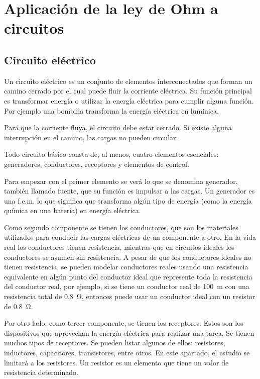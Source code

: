 \section{Aplicación de la ley de Ohm a circuitos}

\subsection{Circuito eléctrico}

Un circuito eléctrico es un conjunto de elementos interconectados que forman un camino cerrado por el cual puede fluir la corriente eléctrica. Su función principal es transformar energía o utilizar la energía eléctrica para cumplir alguna función. Por ejemplo una bombilla transforma la energía eléctrica en lumínica.

Para que la corriente fluya, el circuito debe estar cerrado. Si existe alguna interrupción en el camino, las cargas no pueden circular.

Todo circuito básico consta de, al menos, cuatro elementos esenciales: generadores, conductores, receptores y elementos de control.

Para empezar con el primer elemento se verá lo que se denomina generador, también llamado fuente, que su función es impulsar a las cargas. Un generador es una f.e.m. lo que significa que transforma algún tipo de energía (como la energía química en una batería) en energía eléctrica. 

Como segundo componente se tienen los conductores, que son los materiales utilizados para conducir las cargas eléctricas de un componente a otro. En la vida real los conductores tienen resistencia, mientras que en circuitos ideales los conductores se asumen sin resistencia. A pesar de que los conductores ideales no tienen resistencia, se pueden modelar conductores reales usando una resistencia equivalente en algún punto del conductor ideal que represente toda la resistencia del conductor real, por ejemplo, si se tiene un conductor real de \qty{100}{\metre} con una resistencia total de \qty{0.8}{\ohm}, entonces puede usar un conductor ideal con un resistor de \qty{0.8}{\ohm}.

Por otro lado, como tercer componente, se tienen los receptores. Estos son los dispositivos que aprovechan la energía eléctrica para realizar una tarea. Se tienen muchos tipos de receptores. Se pueden listar algunos de ellos: resistores, inductores, capacitores, transistores, entre otros. En este apartado, el estudio se limitará a los resistores. Un resistor es un elemento que tiene un valor de resistencia determinado.

